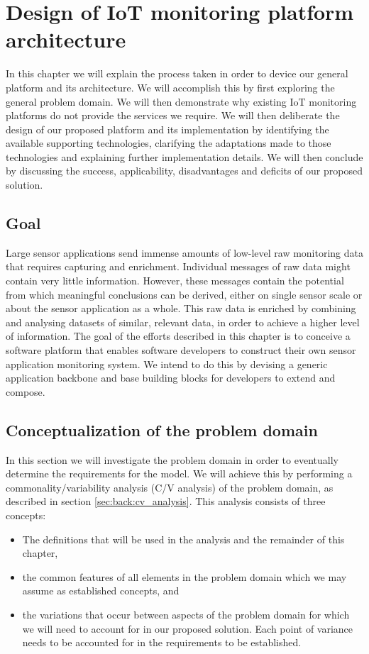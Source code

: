 \newcommand{\archid}{1}
\chapter{Design of IoT monitoring platform architecture}
\label{ch:architecture}
In this chapter we will explain the process taken in order to device our general platform and its architecture. We will accomplish this by first exploring the general problem domain. We will then demonstrate why existing IoT monitoring platforms do not provide the services we require. We will then deliberate the design of our proposed platform and its implementation by identifying the available supporting technologies, clarifying the adaptations made to those technologies and explaining further implementation details. We will then conclude by discussing the success, applicability, disadvantages and deficits of our proposed solution.
\section{Goal}
Large sensor applications send immense amounts of low-level raw monitoring data that requires capturing and enrichment. Individual messages of raw data might contain very little information. However, these messages contain the potential from which meaningful conclusions can be derived, either on single sensor scale or about the sensor application as a whole. This raw data is enriched by combining and analysing datasets of similar, relevant data, in order to achieve a higher level of information. The goal of the efforts described in this chapter is to conceive a software platform that enables software developers to construct their own sensor application monitoring system. We intend to do this by devising a generic application backbone and base building blocks for  developers to extend and compose.  
\section{Conceptualization of the problem domain}
In this section we will investigate the problem domain in order to eventually determine the requirements for the model. We will achieve this by performing a commonality/variability analysis (C/V analysis) of the problem domain, as described in section \ref{sec:back:cv_analysis}. This analysis consists of three concepts:
\begin{itemize}
\item The definitions that will be used in the analysis and the remainder of this chapter, 
\item the common features of all elements in the problem domain which we may assume as established concepts, and 
\item the variations that occur between aspects of the problem domain for which we will need to account for in our proposed solution. Each point of variance needs to be accounted for in the requirements to be established.
\end{itemize}
